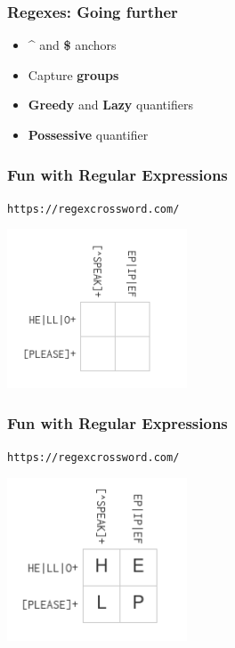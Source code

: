 \documentclass{beamer}
\begin{document}
\begin{frame}[fragile]
    \frametitle{Regexes: Going further}
    \begin{itemize}
        \item \textbf{\textasciicircum} and \textbf{\$} anchors
        \item Capture \textbf{groups}
        \item \textbf{Greedy} and \textbf{Lazy} quantifiers
        \item \textbf{Possessive} quantifier
    \end{itemize}
\end{frame}

\begin{frame}[fragile]
\frametitle{Fun with Regular Expressions}
\texttt{https://regexcrossword.com/}
\begin{center}
\includegraphics[width=0.4\textwidth]{pics/regex/crossword1.png}
\end{center}
\end{frame}

\begin{frame}[fragile]
\frametitle{Fun with Regular Expressions}
\texttt{https://regexcrossword.com/}
\begin{center}
\includegraphics[width=0.4\textwidth]{pics/regex/crossword2.png}
\end{center}
\end{frame}
\end{document}
